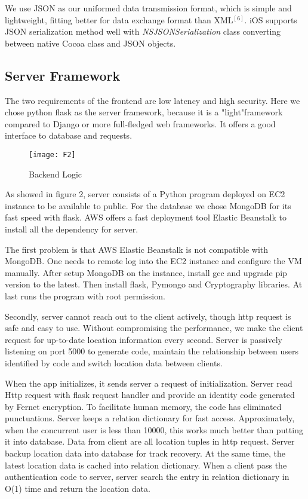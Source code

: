 \documentclass[journal]{IEEEtran}
\begin{document}
We use JSON as our uniformed data transmission format, which is simple and lightweight, fitting better for data exchange format than XML$^{[6]}$. iOS supports JSON serialization method well with \textit{NSJSONSerialization} class converting between native Cocoa class and JSON objects.







\subsection{Server Framework}
The two requirements of the frontend are low latency and high security. Here we chose python flask as the server framework, because it is a "light"framework compared to Django or more full-fledged web frameworks. It offers a good interface to database and requests.

\begin{figure}[h]
\centering
\texttt{[image: F2]}
\caption{Backend Logic}
\end{figure}


As showed in figure 2, server consists of a Python program deployed on EC2 instance to be available to public. For the database we chose MongoDB for its fast speed with flask. AWS offers a fast deployment tool Elastic Beanstalk to install all the dependency for server.

The first problem is that AWS Elastic Beanstalk is not compatible with MongoDB. One needs to remote log into the EC2 instance and configure the VM manually. After setup MongoDB on the instance, install gcc and upgrade pip version to the latest. Then install flask, Pymongo and Cryptography libraries. At last runs the program with root permission.
 
Secondly, server cannot reach out to the client actively, though http request is safe and easy to use.  Without compromising the performance, we make the client request for up-to-date location information every second. Server is passively listening on port 5000 to generate code, maintain the relationship between users identified by code and switch location data between clients.
 
When the app initializes, it sends server a request of initialization. Server read Http request with flask request handler and provide an identity code generated by Fernet encryption. To facilitate human memory, the code has eliminated punctuations.
Server keeps a relation dictionary for fast access. Approximately, when the concurrent user is less than 10000, this works much better than putting it into database. Data from client are all location tuples in http request. Server backup location data into database for track recovery. At the same time, the latest location data is cached into relation dictionary.  When a client pass the authentication code to server, server search the entry in relation dictionary in O(1) time and return the location data.
\end{document}
